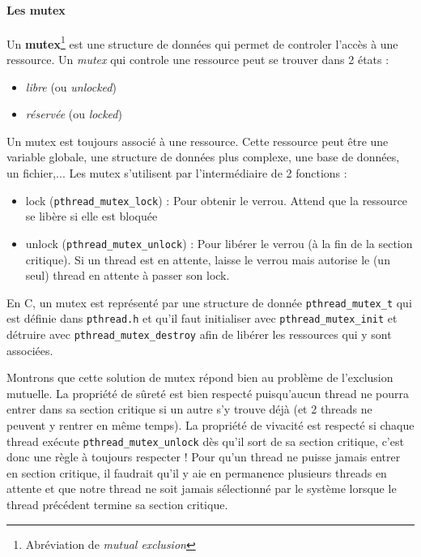 \paragraph{Les mutex}
Un \textbf{mutex}\footnote{Abréviation de \textit{mutual exclusion}} est une structure de données qui permet de controler l'accès à une ressource.
Un \textit{mutex} qui controle une ressource peut se trouver dans 2 états :
\begin{itemize}
  \item \textit{libre} (ou \textit{unlocked})
  \item \textit{réservée} (ou \textit{locked})
\end{itemize}
Un mutex est toujours associé à une ressource.
Cette ressource peut être une variable globale, une structure de données plus complexe, une base de données, un fichier,...
Les mutex s'utilisent par l'intermédiaire de 2 fonctions :
\begin{itemize}
  \item lock (\texttt{pthread\_mutex\_lock}) : Pour obtenir le verrou.
    Attend que la ressource se libère si elle est bloquée
  \item unlock (\texttt{pthread\_mutex\_unlock}) : Pour libérer le verrou (à la fin de la section critique).
    Si un thread est en attente, laisse le verrou mais autorise le (un seul) thread en attente à passer son lock.
\end{itemize}


En C, un mutex est représenté par une structure de donnée \texttt{pthread\_mutex\_t} qui est définie dans \texttt{pthread.h} et qu'il faut initialiser avec \texttt{pthread\_mutex\_init} et détruire avec \texttt{pthread\_mutex\_destroy} afin de libérer les ressources qui y sont associées.

Montrons que cette solution de mutex répond bien au problème de l'exclusion mutuelle.
La propriété de sûreté est bien respecté puisqu'aucun thread ne pourra entrer dans sa section critique si un autre s'y trouve déjà (et 2 threads ne peuvent y rentrer en même temps).
La propriété de vivacité est respecté si chaque thread exécute \texttt{pthread\_mutex\_unlock} dès qu'il sort de sa section critique, c'est donc une règle à toujours respecter ! Pour qu'un thread ne puisse jamais entrer en section critique, il faudrait qu'il y aie en permanence plusieurs threads en attente et que notre thread ne soit jamais sélectionné par le système lorsque le thread précédent termine sa section critique.


